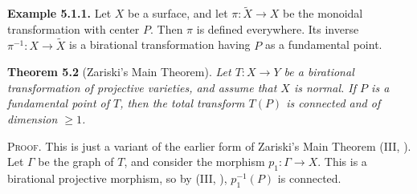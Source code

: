 {\medskip
\noindent\hypertarget{result-V-5.1.1}{}\textbf{Example 5.1.1.} Let $X$ be a surface, and let $\pi\colon\widetilde X\to X$ be the monoidal transformation with center $P$. Then $\pi$ is defined everywhere. Its inverse $\pi^{-1}\colon X\to\widetilde X$ is a birational transformation having $P$ as a fundamental point.

\medskip
\noindent\hypertarget{result-V-5.2}{}\textbf{Theorem 5.2} (Zariski's Main Theorem). \emph{Let $T\colon X\to Y$ be a birational transformation of projective varieties, and assume that $X$ is normal. If $P$ is a fundamental point of $T$, then the total transform $T(P)$ is connected and of dimension $\ge1$.}

\smallskip
\noindent\textsc{Proof.} This is just a variant of the earlier form of Zariski's Main Theorem (III, ). Let $\Gamma$ be the graph of $T$, and consider the morphism $p_1\colon\Gamma\to X$. This is a birational projective morphism, so by (III, ), $p_1^{-1}(P)$ is connected.}
